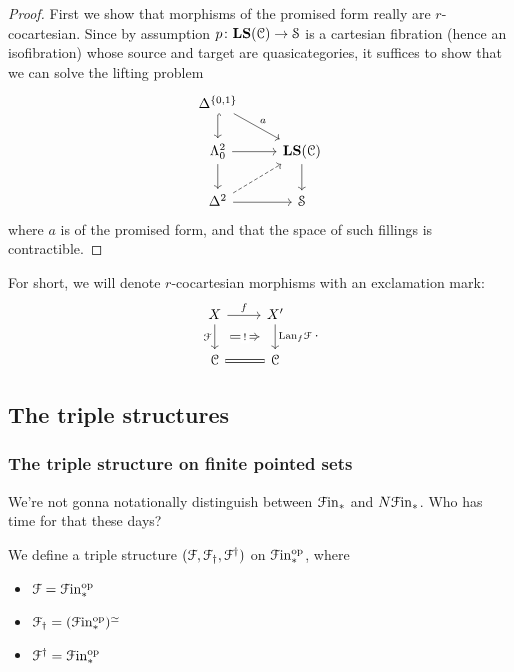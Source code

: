\documentclass[main.tex]{subfiles}
\begin{document}
\begin{proof}
  First we show that morphisms of the promised form really are $r$-cocartesian. Since by assumption $p\colon \mathbf{LS}(\mathcal{C}) \to \mathcal{S}$ is a cartesian fibration (hence an isofibration) whose source and target are quasicategories, it suffices to show that we can solve the lifting problem
  \begin{equation*}
    \begin{tikzcd}
      \Delta^{\{0,1\}}
      \arrow[d, hook]
      \arrow[dr, "a"]
      \\
      \Lambda^{2}_{0}
      \arrow[r]
      \arrow[d]
      & \LS(\category{C})
      \arrow[d]
      \\
      \Delta^{2}
      \arrow[r]
      \arrow[ur, dashed]
      & \S
    \end{tikzcd}
  \end{equation*}
  where $a$ is of the promised form, and that the space of such fillings is contractible.
\end{proof}

For short, we will denote $r$-cocartesian morphisms with an exclamation mark:
\begin{equation*}
  \begin{tikzcd}
    X
    \arrow[r, "f"]
    \arrow[d, ""{name=L, right}, "\mathcal{F}"{left}]
    & X'
    \arrow[d, ""{name=R, left}, "\Lan_{f}\mathcal{F}"{right}]
    \\
    \category{C}
    & \category{C}
    \arrow[l, equals]
    \arrow[Rightarrow, from=L, to=R, shorten=1.5ex, "!"{description}]
  \end{tikzcd}.
\end{equation*}

\subsection{The triple structures}
\label{ssc:the_triple_structures_bare}

\subsubsection{The triple structure on finite pointed sets}
\label{sss:the_triple_structure_on_finite_pointed_sets_bare}

We're not gonna notationally distinguish between $\mathcal{F}\mathrm{in}_{*}$ and $N\mathcal{F}\mathrm{in}_{*}$. Who has time for that these days?

We define a triple structure $(\mathcal{F}, \mathcal{F}_{\dagger}, \mathcal{F}^{\dagger})$ on $\mathcal{F}\mathrm{in}_{*}^{\mathrm{op}}$, where
\begin{itemize}
  \item $\mathcal{F} = \mathcal{F}\mathrm{in}_{*}^{\mathrm{op}}$

  \item $\mathcal{F}_{\dagger} = (\mathcal{F}\mathrm{in}_{*}^{\mathrm{op}})^{\simeq}$

  \item $\mathcal{F}^{\dagger} = \mathcal{F}\mathrm{in}_{*}^{\mathrm{op}}$
\end{itemize}
\end{document}
